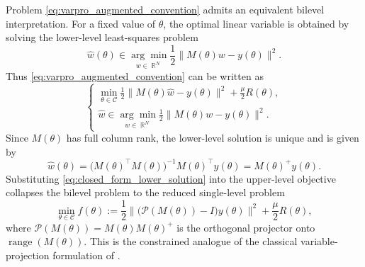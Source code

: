 \documentclass{article}
\DeclareMathOperator{\R}{\mathbb{R}}
\begin{document}
Problem \eqref{eq:varpro_augmented_convention} admits an equivalent bilevel interpretation. For a fixed value of $\theta$, the optimal linear variable is
obtained by solving the lower-level least-squares problem
\[
    \widehat w(\theta)
    \in
    \underset{w \in \R^N}{\arg\min}
    \frac12\|M(\theta)w-y(\theta)\|^2.
\]
Thus \eqref{eq:varpro_augmented_convention} can be written as
\begin{equation}\label{eq:bilevel_varpro_formulation}
\begin{cases}
    \displaystyle
    \min_{\theta \in \mathcal C}
    \frac12 \|M(\theta)\widehat w-y(\theta)\|^2
    + \frac{\mu}{2}R(\theta),
    \\[0.8em]
    \displaystyle
    \widehat w
    \in
    \underset{w \in \R^N}{\arg\min}
    \frac12 \|M(\theta)w-y(\theta)\|^2.
\end{cases}
\end{equation}
Since $M(\theta)$ has full column rank, the lower-level solution is unique and is
given by
\begin{equation}\label{eq:closed_form_lower_solution}
    \widehat w(\theta)
    =
    \bigl(M(\theta)^\top M(\theta)\bigr)^{-1}M(\theta)^\top y(\theta)
    =
    M(\theta)^+y(\theta).
\end{equation}
Substituting \eqref{eq:closed_form_lower_solution} into the upper-level
objective collapses the bilevel problem to the reduced single-level problem
\begin{equation}\label{eq:unrolled}
    \min_{\theta\in\mathcal C}
    f(\theta)
    :=
    \frac12
    \bigl\|
        \bigl(\mathcal P(M(\theta))-I\bigr)y(\theta)
    \bigr\|^2
    +
    \frac{\mu}{2}R(\theta),
\end{equation}
where $\mathcal P(M(\theta))=M(\theta)M(\theta)^+$ is the orthogonal projector
onto $\operatorname{range}(M(\theta))$. 
This is the constrained analogue of the classical variable-projection formulation of
\cite{Gobub_Pereyra_varpro}.
\end{document}
